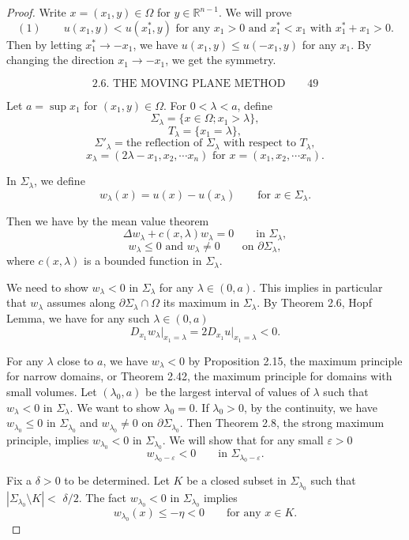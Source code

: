 \begin{proof}
\sketch
Write $x = (x_1,y) \in \Omega$ for $y \in \mathbb{R}^{n-1}$. We will prove
\[
(1)\qquad u(x_1,y) < u(x_1^*,y) \text{ for any } x_1 > 0 \text{ and } x_1^* < x_1 \text{ with } x_1^* + x_1 > 0.
\]
Then by letting $x_1^* \to -x_1$, we have $u(x_1,y) \leq u(-x_1,y)$ for any $x_1$. By changing the direction $x_1 \to -x_1$, we get the symmetry.

\[
\text{2.6. THE MOVING PLANE METHOD}\qquad 49
\]

Let \(a=\sup x_1\) for \((x_1,y)\in\Omega\). For \(0<\lambda<a\), define
\[
\Sigma_\lambda=\{x\in\Omega;x_1>\lambda\},
\]
\[
T_\lambda=\{x_1=\lambda\},
\]
\[
\Sigma'_\lambda=\text{the reflection of }\Sigma_\lambda\text{ with respect to }T_\lambda,
\]
\[
x_\lambda=(2\lambda-x_1,x_2,\cdots x_n)\text{ for }x=(x_1,x_2,\cdots x_n).
\]

In \(\Sigma_\lambda\), we define
\[
w_\lambda(x)=u(x)-u(x_\lambda)\qquad \text{for }x\in\Sigma_\lambda.
\]

Then we have by the mean value theorem
\[
\Delta w_\lambda+c(x,\lambda)w_\lambda=0\qquad \text{in }\Sigma_\lambda,
\]
\[
w_\lambda\leq 0\text{ and }w_\lambda\neq 0\qquad \text{on }\partial\Sigma_\lambda,
\]
where \(c(x,\lambda)\) is a bounded function in \(\Sigma_\lambda\).

We need to show \(w_\lambda<0\) in \(\Sigma_\lambda\) for any \(\lambda\in(0,a)\). This implies in particular
that \(w_\lambda\) assumes along \(\partial\Sigma_\lambda\cap\Omega\) its maximum in \(\Sigma_\lambda\). By Theorem 2.6, Hopf Lemma,
we have for any such \(\lambda\in(0,a)\)
\[
D_{x_1}w_\lambda\bigg|_{x_1=\lambda}=2D_{x_1}u\bigg|_{x_1=\lambda}<0.
\]

For any \(\lambda\) close to \(a\), we have \(w_\lambda<0\) by Proposition 2.15, the maximum
principle for narrow domains, or Theorem 2.42, the maximum principle for domains
with small volumes. Let \((\lambda_0,a)\) be the largest interval of values of \(\lambda\) such that
\(w_\lambda<0\) in \(\Sigma_\lambda\). We want to show \(\lambda_0=0\). If \(\lambda_0>0\), by the continuity, we have \(w_{\lambda_0}\leq 0\)
in \(\Sigma_{\lambda_0}\) and \(w_{\lambda_0}\neq 0\) on \(\partial\Sigma_{\lambda_0}\). Then Theorem 2.8, the strong maximum principle,
implies \(w_{\lambda_0}<0\) in \(\Sigma_{\lambda_0}\). We will show that for any small \(\varepsilon>0\)
\[
w_{\lambda_0-\varepsilon}<0\qquad \text{in }\Sigma_{\lambda_0-\varepsilon}.
\]

Fix a \(\delta>0\) to be determined. Let \(K\) be a closed subset in \(\Sigma_{\lambda_0}\) such that \(|\Sigma_{\lambda_0}\setminus K|<\)
\(\delta/2\). The fact \(w_{\lambda_0}<0\) in \(\Sigma_{\lambda_0}\) implies
\[
w_{\lambda_0}(x)\leq -\eta<0\qquad \text{for any }x\in K.
\]


\end{proof}
